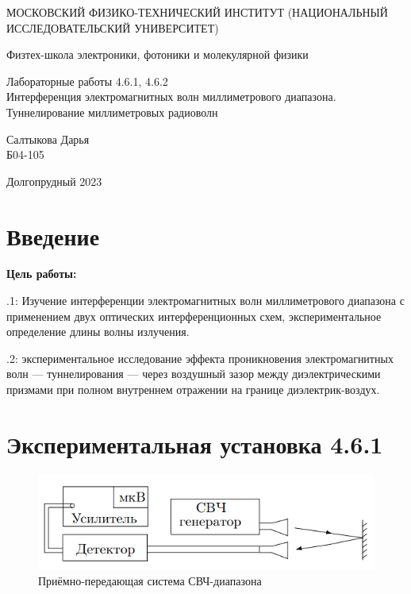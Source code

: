 \documentclass[a4paper,12pt]{article} %
\begin{document}
	
	\begin{titlepage}
	\begin{center}
		{\large МОСКОВСКИЙ ФИЗИКО-ТЕХНИЧЕСКИЙ ИНСТИТУТ (НАЦИОНАЛЬНЫЙ ИССЛЕДОВАТЕЛЬСКИЙ УНИВЕРСИТЕТ)}
	\end{center}
	\begin{center}
		{\large Физтех-школа электроники, фотоники и молекулярной физики}
	\end{center}
	
	
	\vspace{4.5cm}
	{\huge
		\begin{center}
			{Лабораторные работы 4.6.1, 4.6.2}\\
			Интерференция электромагнитных волн миллиметрового диапазона. Туннелирование миллиметровых радиоволн
		\end{center}
	}
	\vspace{2cm}
	\begin{flushright}
		{\LARGE Салтыкова Дарья \\
			\vspace{0.5cm}
			Б04-105}
	\end{flushright}
	\vspace{8cm}
	\begin{center}
		Долгопрудный 2023
	\end{center}
\end{titlepage}

\section{Введение}

\noindent \textbf{Цель работы:}

\medskip

.1: Изучение интерференции электромагнитных волн миллиметрового диапазона с применением двух оптических интерференционных схем, экспериментальное определение длины волны излучения.

\medskip

.2: экспериментальное исследование эффекта проникновения электромагнитных волн — туннелирования — через воздушный зазор между диэлектрическими призмами при полном внутреннем отражении на границе диэлектрик-воздух.

\section{Экспериментальная установка 4.6.1}

\begin{figure}[h]
    \centering
    \includegraphics[width=12cm]{fig1.PNG}
    \caption{Приёмно-передающая система СВЧ-диапазона}
    \label{fig:vac}
\end{figure}
\end{document}
